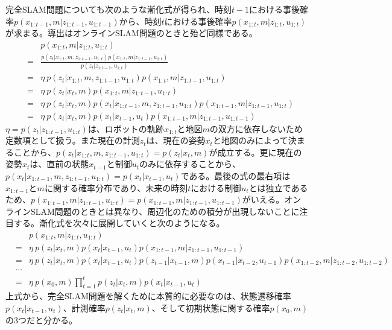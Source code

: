 \documentclass[dvipdfmx,a4paper]{jsarticle}
\begin{document}
完全SLAM問題についても次のような漸化式が得られ、時刻$t - 1$における事後確率$p(x_{1 : t - 1}, m | z_{1 : t - 1}, u_{1 : t - 1})$から、時刻$t$における事後確率$p(x_{1 : t}, m | z_{1 : t}, u_{1 : t})$が求まる。導出はオンラインSLAM問題のときと殆ど同様である。
\begin{eqnarray}
	&& p(x_{1 : t}, m | z_{1 : t}, u_{1 : t}) \nonumber \\
	&=& \frac{p(z_t | x_{1 : t}, m, z_{1 : t - 1}, u_{1 : t}) p(x_{1 : t}, m | z_{1 : t - 1}, u_{1 : t})}{p(z_t | z_{1 : t - 1}, u_{1 : t})} \nonumber \\
	&=& \eta \ p(z_t | x_{1 : t}, m, z_{1 : t - 1}, u_{1 : t}) p(x_{1 : t}, m | z_{1 : t - 1}, u_{1 : t}) \nonumber \\
	&=& \eta \ p(z_t | x_t, m) p(x_{1 : t}, m | z_{1 : t - 1}, u_{1 : t}) \nonumber \\
	&=& \eta \ p(z_t | x_t, m) p(x_t | x_{1 : t - 1}, m, z_{1 : t - 1}, u_{1 : t}) p(x_{1 : t - 1}, m | z_{1 : t - 1}, u_{1 : t}) \nonumber \\
	&=& \eta \ p(z_t | x_t, m) p(x_t | x_{t - 1}, u_t) p(x_{1 : t - 1}, m | z_{1 : t - 1}, u_{1 : t - 1})
\end{eqnarray}
$\eta = p(z_t | z_{1 : t - 1}, u_{1 : t})$は、ロボットの軌跡$x_{1 : t}$と地図$m$の双方に依存しないため定数項として扱う。また現在の計測$z_t$は、現在の姿勢$x_t$と地図のみによって決まることから、$p(z_t | x_{1 : t}, m, z_{1 : t - 1}, u_{1 : t}) = p(z_t | x_t, m)$が成立する。更に現在の姿勢$x_t$は、直前の状態$x_{t - 1}$と制御$u_t$のみに依存することから、$p(x_t | x_{1 : t - 1}, m, z_{1 : t - 1}, u_{1 : t}) = p(x_t | x_{t - 1}, u_t)$である。最後の式の最右項は$x_{1 : t - 1}$と$m$に関する確率分布であり、未来の時刻$t$における制御$u_t$とは独立であるため、$p(x_{1 : t - 1}, m | z_{1 : t - 1}, u_{1 : t}) = p(x_{1 : t - 1}, m | z_{1 : t - 1}, u_{1 : t - 1})$がいえる。オンラインSLAM問題のときとは異なり、周辺化のための積分が出現しないことに注目する。漸化式を次々に展開していくと次のようになる。
\begin{eqnarray}
	&& p(x_{1 : t}, m | z_{1 : t}, u_{1 : t}) \nonumber \\
	&=& \eta \ p(z_t | x_t, m) p(x_t | x_{t - 1}, u_t) p(x_{1 : t - 1}, m | z_{1 : t - 1}, u_{1 : t - 1}) \nonumber \\
	&=& \eta \ p(z_t | x_t, m) p(x_t | x_{t - 1}, u_t) p(z_{t - 1} | x_{t - 1}, m) p(x_{t - 1} | x_{t - 2}, u_{t - 1}) p(x_{1 : t - 2}, m | z_{1 : t - 2}, u_{1 : t - 2}) \nonumber \\
	&\cdots& \nonumber \\
	&=& \eta \ p(x_0, m) \prod_{t = 1}^t p(z_t | x_t, m) p(x_t | x_{t - 1}, u_t)
\end{eqnarray}
上式から、完全SLAM問題を解くために本質的に必要なのは、状態遷移確率$p(x_t | x_{t - 1}, u_t)$、計測確率$p(z_t | x_t, m)$、そして初期状態に関する確率$p(x_0, m)$の3つだと分かる。
\end{document}
